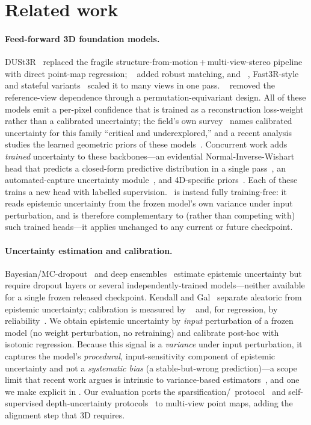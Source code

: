 \section{Related work}
\label{sec:related}

\paragraph{Feed-forward 3D foundation models.}
DUSt3R~\cite{dust3r} replaced the fragile structure-from-motion\,+\,multi-view-stereo pipeline with
direct point-map regression; \mastr~\cite{mast3r} added robust matching, and \vggt~\cite{vggt},
Fast3R-style and stateful variants~\cite{fast3r,cut3r} scaled it to many views in one pass.
\pii~\cite{pi3} removed the reference-view dependence through a permutation-equivariant design. All
of these models emit a per-pixel confidence that is trained as a reconstruction loss-weight rather
than a calibrated uncertainty; the field's own survey~\cite{survey3d} names calibrated uncertainty
for this family ``critical and underexplored,'' and a recent analysis studies the learned geometric
priors of these models~\cite{geompriors}. Concurrent work adds \emph{trained} uncertainty to these
backbones---an evidential Normal-Inverse-Wishart head that predicts a closed-form predictive
distribution in a single pass~\cite{trust3r_evidential}, an automated-capture uncertainty
module~\cite{auto3r}, and 4D-specific priors~\cite{robust4d}. Each of these trains a new head with
labelled supervision. \trustr\ is instead fully training-free: it reads epistemic uncertainty from
the frozen model's own variance under input perturbation, and is therefore complementary to (rather
than competing with) such trained heads---it applies unchanged to any current or future checkpoint.

\paragraph{Uncertainty estimation and calibration.}
Bayesian/MC-dropout~\cite{mcdropout} and deep ensembles~\cite{ensembles} estimate epistemic
uncertainty but require dropout layers or several independently-trained models---neither available
for a single frozen released checkpoint. Kendall and Gal~\cite{kendallgal} separate aleatoric from
epistemic uncertainty; calibration is measured by \ece~\cite{guo} and, for regression, by
reliability~\cite{kuleshov}. We obtain epistemic uncertainty by \emph{input} perturbation of a frozen
model (no weight perturbation, no retraining) and calibrate post-hoc with isotonic regression.
Because this signal is a \emph{variance} under input perturbation, it captures the model's
\emph{procedural}, input-sensitivity component of epistemic uncertainty and not a \emph{systematic
bias} (a stable-but-wrong prediction)---a scope limit that recent work argues is intrinsic to
variance-based estimators~\cite{epistemic_incomplete}, and one we make explicit in
. Our evaluation ports the sparsification/\ause\ protocol~\cite{ilg} and
self-supervised depth-uncertainty protocols~\cite{poggi} to multi-view point maps, adding the
alignment step that 3D requires.

